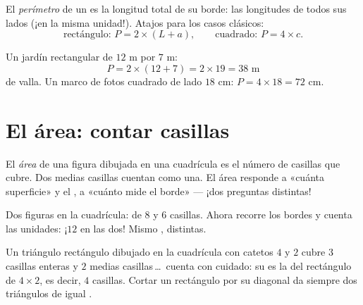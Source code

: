 \begin{definition}[Perímetro]\label{def:g4:measure:perimeter}
El \emph{perímetro} de un  es la longitud
total de su borde:  las longitudes de todos sus lados (¡en la misma
unidad!). Atajos para los casos clásicos:
\[
\text{rectángulo: } P = 2 \times (L + a),
\qquad
\text{cuadrado: } P = 4 \times c .
\]
\end{definition}

\begin{example}\label{ex:g4:measure:perimeter}
Un jardín rectangular de $12$ m por $7$ m:
\[
P = 2 \times (12 + 7) = 2 \times 19 = 38 \text{ m}
\]
de valla. Un marco de fotos cuadrado de lado $18$ cm:
$P = 4 \times 18 = 72$ cm.
\end{example}

\section{El área: contar casillas}

\begin{definition}\label{def:g4:measure:area}
El \emph{área} de una figura dibujada en una cuadrícula es el número
de casillas que cubre. Dos medias casillas cuentan como una. El área
responde a «cuánta superficie» y el , a «cuánto mide el
borde» --- ¡dos preguntas distintas!
\end{definition}

\begin{omfigure}

{\small Dos figuras en la cuadrícula:  de $8$ y $6$ casillas. Ahora recorre
los bordes y cuenta las unidades: ¡$12$ en las dos! Mismo ,
 distintas.}
\end{omfigure}

\begin{example}\label{ex:g4:measure:half}
Un triángulo rectángulo dibujado en la cuadrícula con catetos $4$ y $2$ cubre $3$
casillas enteras y $2$ medias casillas\,\dots\ cuenta con cuidado: su 
es la  del rectángulo de $4 \times 2$, es decir, $4$ casillas. Cortar un
rectángulo por su diagonal da siempre dos triángulos de igual
.
\end{example}

